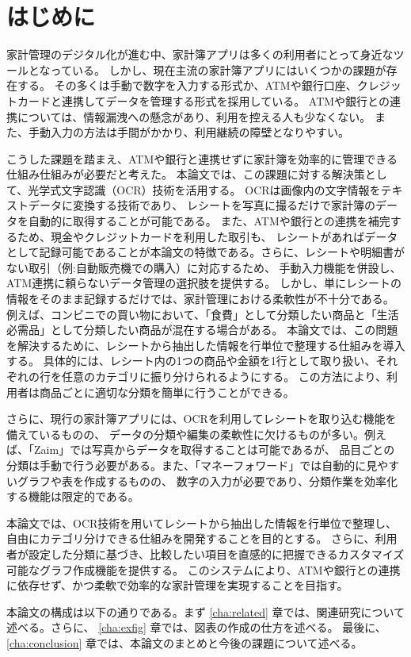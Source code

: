 \documentclass[main]{subfiles}
\begin{document}
\chapter{はじめに}
\label{cha:intro}

家計管理のデジタル化が進む中、家計簿アプリは多くの利用者にとって身近なツールとなっている。
しかし、現在主流の家計簿アプリにはいくつかの課題が存在する。
その多くは手動で数字を入力する形式か、ATMや銀行口座、クレジットカードと連携してデータを管理する形式を採用している。
ATMや銀行との連携については、情報漏洩への懸念があり、利用を控える人も少なくない。
また、手動入力の方法は手間がかかり、利用継続の障壁となりやすい。

こうした課題を踏まえ、ATMや銀行と連携せずに家計簿を効率的に管理できる仕組み仕組みが必要だと考えた。
本論文では、この課題に対する解決策として、光学式文字認識（OCR）技術を活用する。
OCRは画像内の文字情報をテキストデータに変換する技術であり、
レシートを写真に撮るだけで家計簿のデータを自動的に取得することが可能である。
また、ATMや銀行との連携を補完するため、現金やクレジットカードを利用した取引も、
レシートがあればデータとして記録可能であることが本論文の特徴である。さらに、レシートや明細書がない取引（例:自動販売機での購入）に対応するため、
手動入力機能を併設し、ATM連携に頼らないデータ管理の選択肢を提供する。
しかし、単にレシートの情報をそのまま記録するだけでは、家計管理における柔軟性が不十分である。
例えば、コンビニでの買い物において、「食費」として分類したい商品と「生活必需品」として分類したい商品が混在する場合がある。
本論文では、この問題を解決するために、レシートから抽出した情報を行単位で整理する仕組みを導入する。
具体的には、レシート内の1つの商品や金額を1行として取り扱い、それぞれの行を任意のカテゴリに振り分けられるようにする。
この方法により、利用者は商品ごとに適切な分類を簡単に行うことができる。

さらに、現行の家計簿アプリには、OCRを利用してレシートを取り込む機能を備えているものの、
データの分類や編集の柔軟性に欠けるものが多い。例えば、「Zaim」では写真からデータを取得することは可能であるが、
品目ごとの分類は手動で行う必要がある。また、「マネーフォワード」では自動的に見やすいグラフや表を作成するものの、
数字の入力が必要であり、分類作業を効率化する機能は限定的である。

本論文では、OCR技術を用いてレシートから抽出した情報を行単位で整理し、自由にカテゴリ分けできる仕組みを開発することを目的とする。
さらに、利用者が設定した分類に基づき、比較したい項目を直感的に把握できるカスタマイズ可能なグラフ作成機能を提供する。
このシステムにより、ATMや銀行との連携に依存せず、かつ柔軟で効率的な家計管理を実現することを目指す。

本論文の構成は以下の通りである。まず \ref{cha:related} 章では、関連研究について述べる。さらに、
\ref{cha:exfig} 章では、図表の作成の仕方を述べる。
最後に、\ref{cha:conclusion} 章では、本論文のまとめと今後の課題について述べる。
\end{document}
